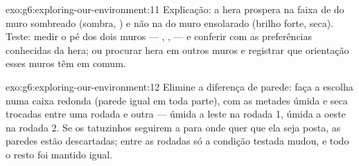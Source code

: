 \begin{solution}{exo:g6:exploring-our-environment:11}
Explicação: a hera prospera na faixa de  do muro sombreado
(sombra, ) e não na do muro ensolarado (brilho forte, seca).
Teste: medir o pé dos dois muros --- , ,  --- e
conferir com as preferências conhecidas da hera; ou procurar hera em
outros muros e registrar que orientação esses muros têm em comum.
\end{solution}

\begin{solution}{exo:g6:exploring-our-environment:12}
Elimine a diferença de parede: faça a escolha numa caixa redonda
(parede igual em toda parte), com as metades úmida e seca trocadas
entre uma rodada e outra --- úmida a leste na rodada 1, úmida a oeste
na rodada 2. Se os tatuzinhos seguirem a  para onde quer que
ela seja posta, as paredes estão descartadas; entre as rodadas só a
condição testada mudou, e todo o resto foi mantido igual.
\end{solution}

